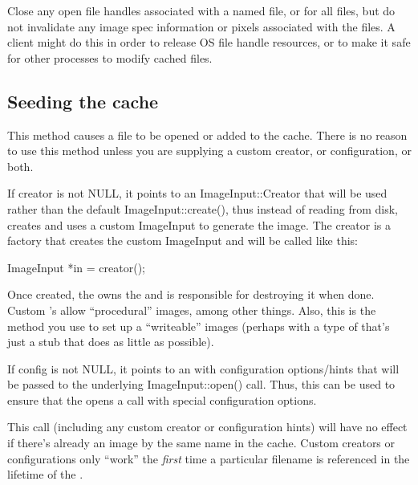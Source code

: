 \NEW %
Close any open file handles associated with a named file, or for all
files, but do not invalidate any image spec information or pixels
associated with the files.  A client might do this in order to
release OS file handle resources, or to make it safe for other
processes to modify cached files.
\apiend

\subsection{Seeding the cache}
\label{sec:imagecache:api:seeding}
This method causes a file to be opened or added to the
cache. There is no reason to use this method unless you are supplying
a custom creator, or configuration, or both.

If {\cf creator} is not NULL, it points to an {\cf ImageInput::Creator} that
will be used rather than the default {\cf ImageInput::create()}, thus
instead of reading from disk, creates and uses a custom ImageInput
to generate the image. The {\cf creator} is a factory that creates the
custom ImageInput and will be called like this:
\begin{code}
    ImageInput *in = creator();
\end{code}
Once created, the \ImageCache owns the \ImageInput and is responsible
for destroying it when done. Custom \ImageInput's allow ``procedural''
images, among other things.  Also, this is the method you use to set
up a ``writeable'' \ImageCache images (perhaps with a type of
\ImageInput that's just a stub that does as little as possible).

If {\cf config} is not NULL, it points to an \ImageSpec with configuration
options/hints that will be passed to the underlying
{\cf ImageInput::open()} call. Thus, this can be used to ensure that the
\ImageCache opens a call with special configuration options.

This call (including any custom creator or configuration hints) will
have no effect if there's already an image by the same name in the
cache. Custom creators or configurations only ``work'' the \emph{first} time
a particular filename is referenced in the lifetime of the
\ImageCache.
\apiend

